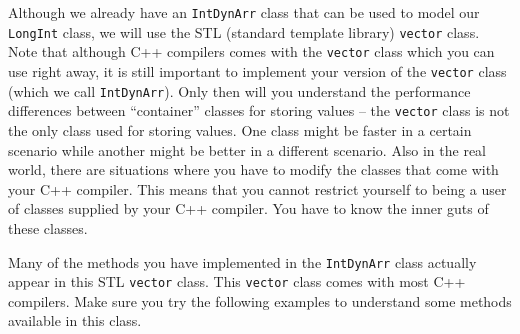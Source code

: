 Although we already have an \verb!IntDynArr! class that can be used 
to model our \verb!LongInt! class, we will use the STL (standard 
template library) \verb!vector! class. Note that although C++ 
compilers comes with the \verb!vector! class which you can use right 
away, it is still important to implement your version of the 
\verb!vector! class (which we call \verb!IntDynArr!). Only then will 
you understand the performance differences between “container” classes  
for storing values -- the \verb!vector! class is not the only class used 
for storing values. One class might be faster in a certain scenario while 
another might be better in a different scenario. Also in the real world, 
there are situations where you have to modify the classes that come with 
your C++ compiler. This means that you cannot restrict yourself to being 
a user of classes supplied by your C++ compiler. You have to know the 
inner guts of these classes.

Many of the methods you have implemented in the \verb!IntDynArr! class 
actually appear in this STL \verb!vector! class. This \verb!vector! class 
comes with most C++ compilers. Make sure you try the following examples 
to understand some methods available in this class.

